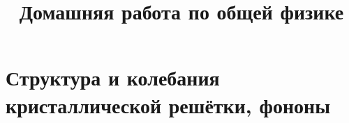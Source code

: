 \documentclass[a4paper]{article}
\title{Домашняя работа по общей физике}
\begin{document}
	\maketitle
\section{Структура и колебания
кристаллической решётки, фононы}
%
\end{document}
